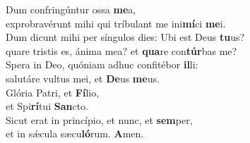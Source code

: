 \evenverse Dum confringúntur ossa \textbf{me}a,~\*\\
\evenverse exprobravérunt mihi qui tríbulant me ini\textbf{mí}ci \textbf{me}i.\\
\oddverse Dum dicunt mihi per síngulos dies: Ubi est Deus \textbf{tu}us?~\*\\
\oddverse quare tristis es, ánima mea? et \textbf{qua}re con\textbf{túr}bas me?\\
\evenverse Spera in Deo, quóniam adhuc confitébor \textbf{il}li:~\*\\
\evenverse salutáre vultus mei, et \textbf{De}us \textbf{me}us.\\
\oddverse Glória Patri, et \textbf{Fí}lio,~\*\\
\oddverse et Spi\textbf{rí}tui \textbf{San}cto.\\
\evenverse Sicut erat in princípio, et nunc, et \textbf{sem}per,~\*\\
\evenverse et in sǽcula sæcu\textbf{ló}rum. \textbf{A}men.\\
